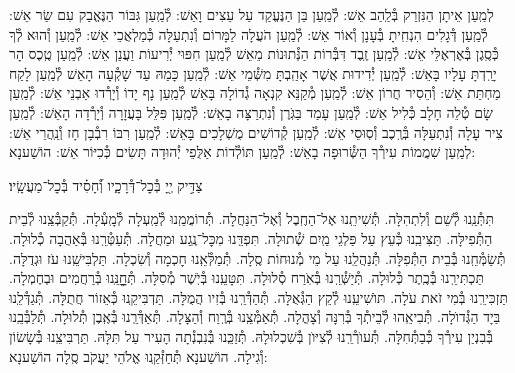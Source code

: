 \documentclass[twoside, openany, parskip=half, 11pt]{book}
\begin{document}
לְמַֽעַן אֵיתָן הַנִּזְרַק בְּ֯לַֽהַב אֵשׁ: לְ֯מַֽעַן בֵּן הַנֶּעֱקַד עַל עֵצִים וָאֵשׁ: לְ֯מַֽעַן גִּבּוֹר הַנֶּאֱבַק עִם שַׂר אֵשׁ: לְ֯מַֽעַן דְּ֯גָלִים הִנְחִֽיתָ בְּ֯עָנָן וְ֯אוֹר אֵשׁ: לְ֯מַֽעַן הֹעֲלָה לַמָּרוֹם וְ֯נִתְעַלָּה כְּ֯מַלְאֲכֵי אֵשׁ: לְ֯מַֽעַן וְ֯הוּא לְ֯ךָ כְּ֯סֶֽגֶן בְּ֯אֶרְאֶלֵּי אֵשׁ: לְ֯מַֽעַן זֶֽבֶד דִּבְּ֯רוֹת הַנְּ֯תוּנוֹת מֵאֵשׁ לְ֯מַֽעַן חִפּוּי יְ֯רִיעוֹת וַעֲנַן אֵשׁ: לְ֯מַֽעַן טֶֽכֶס הָר יָרַֽדְתָּ עָלָיו בָּאֵשׁ: לְ֯מַֽעַן יְ֯דִידוּת אֲשֶׁר אָהַֽבְתָּ מִשְּׁ֯מֵי אֵשׁ: לְ֯מַֽעַן כָּמַהּ עַד שָׁקְ֯עָה הָאֵשׁ לְ֯מַֽעַן לָקַח מַחְתַּת אֵשׁ: וְ֯הֵסִיר חֲרוֹן אֵשׁ: לְ֯מַֽעַן מְ֯קַנֵּא קִנְאָה גְ֯דוֹלָה בָּאֵשׁ לְ֯מַֽעַן נָף יָדוֹ וְ֯יָרְ֯דוּ אַבְנֵי אֵשׁ: לְ֯מַֽעַן שָׂם טְ֯לֵה חָלָב כְּ֯לִיל אֵשׁ: לְ֯מַֽעַן עָמַד בַּגֹּֽרֶן וְ֯נִתְרַצָּה בָאֵשׁ: לְ֯מַֽעַן פִּלֵּל בָּעֲזָרָה וְ֯יָרְ֯דָה הָאֵשׁ: לְ֯מַֽעַן צִיר עָלָה וְ֯נִתְעַלָּה בְּ֯רֶֽכֶב וְ֯סֽוּסֵי אֵשׁ: לְ֯מַֽעַן קְ֯דוֹשִׁים מֻשְׁלָכִים בָּאֵשׁ: לְ֯מַֽעַן רִבּוֹ רִבְ֯בָן חָז וְ֯נַֽהֲרֵי אֵשׁ:
לְמַֽעַן שִׁמֲמוֹת עִירְ֯ךָ הַשְּׂ֯רוּפָה בָאֵשׁ:
לְ֯מַֽעַן תּוֹלְ֯דוֹת אַלֻּפֵי יְ֯הוּדָה תָּשִׂים כְּ֯כִיּוֹר אֵשׁ: הוֹשַׁענָא:

צַדִּ֣יק יְ֖יָ בְּ֯כׇל־דְּ֯רָכָ֑יו וְ֯֝חָסִ֗יד בְּ֯כׇל־מַעֲשָֽׂיו׃

תִּתְּ֯נֵֽנוּ לְ֯שֵׁם וְ֯לִתְהִלָּה.
תְּ֯שִׁיתֵֽנוּ אֶל־הַחֶֽבֶל וְ֯אֶל־הַנַּחֲלָה.
תְּ֯רוֹמֲמֵֽנוּ לְ֯מַֽעְלָה לְ֯מָֽעְ֯לָה.
תְּ֯קַבְּ֯צֵֽנוּ לְ֯בֵית הַתְּ֯פִילָּה.
תַּצִּיבֵֽנוּ כְּ֯עֵץ עַל פַּלְגֵי מַֽיִם שְׁ֯תוּלָה.
תִּפְדֵּֽנוּ מִכׇּל־נֶֽגַע וּמַחֲלָה.
תְּ֯עַטְּ֯רֵֽנוּ בְּ֯אַהֲבָה כְ֯לוּלָה.
תְּ֯שַׂמְּ֯חֵֽנוּ בְּ֯בֵית הַתְּ֯פִלָּה.
תְּ֯נַהֲלֵֽנוּ עַל מֵי מְ֯נוּחוֹת סֶֽלָה.
תְּ֯מַלְּ֯אֵֽנוּ חׇכְמָה וְ֯שִׂכְלָה.
תַּלְבִּישֵֽׁנוּ עֹז וּגְדֻלָּה.
תַּכְתִּירֵֽנוּ בְּ֯כֶֽתֶר כְּ֯לוּלָה.
תְּ֯יַשְּׁ֯רֵֽנוּ בְּ֯אֹֽרַח סְ֯לוּלָה.
תִּטָּעֵֽנוּ בְּ֯יֹֽשֶׁר מְ֯סִלָּה.
תְּ֯חׇׇׇׇנֵּֽנוּ בְּ֯רַחֲמִים וּבְחֶמְלָה.
תַּזְכִּירֵֽנוּ בְּ֯מִי זֹאת עֹלָה.
תּוׂשִׁיעֵֽנוּ לְ֯קֵץ הַגְּ֯אֻלָּה.
תְּ֯הַדְּ֯רֵֽנוּ בְּ֯זִיו הֲמֻלָּה.
תַּדְבִּיקֵֽנוּ כְּ֯אֵזוֹר חֲתֻלָּה.
תְּ֯גַדְּ֯לֵֽנוּ בַּיָד הַגְּ֯דוׂלָה.
תְּ֯בִיאֵֽהוּ לְ֯בֵיתְ֯ךָ בְּ֯רִנָּה וְ֯צָהֳלָה.
תְּ֯אַמְּ֯צֵֽנוּ בְּ֯רֶֽוַח וְ֯הַצָּלָה.
תְּ֯אַדְּ֯רְֵנוּ בְּ֯אֶֽבֶן תְּ֯לוּלָה.
תְּ֯לַבְּ֯בֵֽנוּ בְּ֯בִנְיַן עִירְ֯ךָ כְּ֯בַתְּ֯חִלָּה.
תְּ֯עוׂרְ֯רֵֽנוּ לְ֯צִיּוׂן בְּ֯שִׁכְלוּלָהּ.
תְּ֯זַכְֵּנוּ בְּ֯נִבְנְ֯תָה הָעִיר עַל תִּלָּהּ.
תַּרְבִּיצֵֽנוּ בְּ֯שָׂשׂוֹן וְ֯גִילָה.
הוֹשַׁענָא תְּ֯חַזְּ֯קֵֽנוּ אֱלֹהֵי יַעֲקֹב סֶֽלָה הוֹשַׁענָא:
\end{document}
